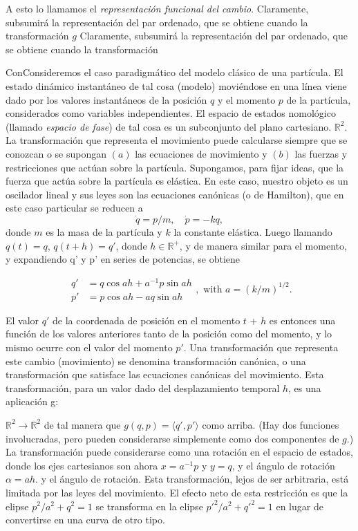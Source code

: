 \begin{justifying}
    A esto lo llamamos el \emph{representación funcional del cambio}. Claramente, subsumirá la representación del par ordenado, que se obtiene cuando la transformación $g$ Claramente, subsumirá la representación del par ordenado, que se obtiene cuando la transformación

    ConConsideremos el caso paradigmático del modelo clásico de una partícula. El   estado dinámico instantáneo de tal cosa (modelo) moviéndose en una línea viene  dado por los valores instantáneos de la posición $q$ y el momento $p$ de la    partícula, considerados como variables independientes. El espacio de estados nomológico (llamado \emph{espacio de fase}) de tal cosa es un subconjunto del plano cartesiano. $\mathbb{R}^2$. La transformación que representa el movimiento puede calcularse siempre que se conozcan o se supongan $(a)$ las ecuaciones de movimiento y $(b)$ las fuerzas y restricciones que actúan sobre la partícula. Supongamos, para fijar ideas, que la fuerza que actúa sobre la partícula es elástica. En este caso, nuestro objeto es un oscilador lineal y sus leyes son las ecuaciones canónicas (o de Hamilton), que en este caso particular se reducen a
    \[
    \dot{q} = p/m, \quad \dot{p} = -kq,
    \]
    donde $m$ es la masa de la partícula y $k$ la constante elástica. Luego    llamando $q(t)=q$, $q(t+h)=q'$, donde $h \in \mathbb{R}^+$, y de manera similar para el momento, y expandiendo q' y p' en series de potencias, se obtiene

    \[
    \begin{aligned}
    q' &= q \cos ah + a^{-1}p \sin ah \\
    p' &= p \cos ah - aq \sin ah
    \end{aligned}
    , \text{ with } a = (k/m)^{1/2}.
    \]

    El valor $q'$ de la coordenada de posición en el momento $t$ + $h$ es entonces una función de los valores anteriores tanto de la posición como del momento, y
    lo mismo ocurre con el valor del momento $p'$. Una transformación que representa este cambio (movimiento) se denomina transformación canónica, o una transformación
    que satisface las ecuaciones canónicas del movimiento. Esta transformación,
    para un valor dado del desplazamiento temporal $h$, es una aplicación g:
    
    $\mathbb{R}^2 \to \mathbb{R}^2$ de tal manera que $g(q, p) = \langle q', p' \rangle$ como arriba. (Hay dos funciones involucradas, pero pueden considerarse simplemente como dos componentes de $g$.) La transformación puede considerarse como una rotación en el espacio de estados, donde los ejes cartesianos son ahora $x = a^{-1}p$ y $y=q$, y el ángulo de rotación $\alpha = ah$. y el ángulo de rotación. Esta transformación, lejos de ser arbitraria, está limitada por las leyes del movimiento. El efecto neto de esta restricción es que la elipse $p^2/a^2 + q^2 = 1$ se transforma en la elipse $p'^2/a^2 + q'^2 = 1$ en lugar de convertirse en una curva de otro tipo.


\end{justifying}
